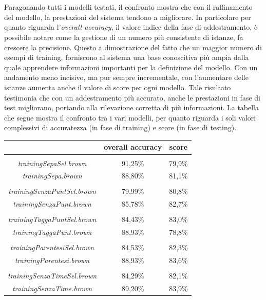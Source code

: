 \documentclass[a4paper]{report}
\begin{document}
\\\\
Paragonando tutti i modelli testati, il confronto mostra che con il raffinamento del modello, la prestazioni del sistema tendono a migliorare. In particolare per quanto riguarda l'\textit{overall accuracy}, il valore indice della fase di addestramento, è possibile notare come la gestione di un numero più consistente di istanze, fa crescere la precisione. Questo a dimostrazione del fatto che un maggior numero di esempi di training, forniscono al sistema una base conoscitiva più ampia dalla quale apprendere informazioni importanti per la definizione del modello. Con un andamento meno incisivo, ma pur sempre incrementale, con l'aumentare delle istanze aumenta anche il valore di score per ogni modello. Tale risultato testimonia che con un addestramento più accurato, anche le prestazioni in fase di test migliorano, portando alla rilevazione corretta di più informazioni. La tabella che segue mostra il confronto tra i vari modelli, per quanto riguarda i soli valori complessivi di accuratezza (in fase di training) e score (in fase di testing).
\begin{center}
\begin{tabular}{|ccc|}
\hline
 & \textbf{overall accuracy} & \textbf{score}\\
\hline
 & &  \\
\hline
\textit{trainingSepaSel.brown} & 91,25\% & 79,9\% \\
\textit{trainingSepa.brown} & 88,80\% & 81,1\% \\
\hline
 & &  \\
\hline
\textit{trainingSenzaPuntSel.brown} & 79,99\% & 80,8\% \\
\textit{trainingSenzaPunt.brown} & 85,78\% & 82,7\% \\
\hline
 & &  \\
\hline
\textit{trainingTaggaPuntSel.brown} & 84,43\% & 83,0\% \\
\textit{trainingTaggaPunt.brown} & 88,93\% & 78,8\% \\
\hline
 & &  \\
\hline
\textit{trainingParentesiSel.brown} & 84,53\% &  82,3\% \\
\textit{trainingParentesi.brown} & 88,93\% & 83,6\% \\
\hline
 & &  \\
\hline
\textit{trainingSenzaTimeSel.brown} & 84,29\% & 82,1\% \\
\textit{trainingSenzaTime.brown} & 89,20\% & 83,9\% \\
\hline
\end{tabular}
\end{center}
\end{document}
